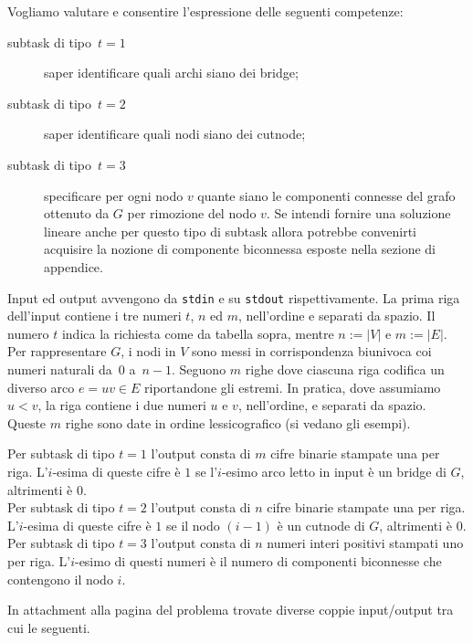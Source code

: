 Vogliamo valutare e consentire l'espressione delle seguenti competenze:
\begin{description}
\item[subtask di tipo~$t=1$] saper identificare quali archi siano dei bridge;
\item[subtask di tipo~$t=2$] saper identificare quali nodi siano dei cutnode;
\item[subtask di tipo~$t=3$] specificare per ogni nodo $v$ quante siano le componenti connesse del grafo ottenuto da $G$ per rimozione del nodo $v$. Se intendi fornire una soluzione lineare anche per questo tipo di subtask allora potrebbe convenirti acquisire la nozione di componente biconnessa esposte nella sezione di appendice. 
\end{description}



Input ed output avvengono da \verb'stdin' e su \verb'stdout' rispettivamente.
La prima riga dell'input contiene i tre numeri $t$, $n$ ed $m$, nell'ordine e separati da spazio. Il numero $t$ indica la richiesta come da tabella sopra, mentre $n:=|V|$ e $m:=|E|$. Per rappresentare $G$, i nodi in $V$ sono messi in corrispondenza biunivoca coi numeri naturali da~$0$ a~$n-1$.
Seguono $m$ righe dove ciascuna riga codifica un diverso arco $e=uv\in E$ riportandone gli estremi. In pratica, dove assumiamo $u < v$, la riga contiene i due numeri $u$ e $v$, nell'ordine, e separati da spazio.
Queste $m$ righe sono date in ordine lessicografico (si vedano gli esempi).

\indent
Per subtask di tipo $t=1$ l'output consta di $m$ cifre binarie stampate una per riga. L'$i$-esima di queste cifre è $1$ se l'$i$-esimo arco letto in input è un bridge di $G$, altrimenti è $0$.\\
\indent
Per subtask di tipo $t=2$ l'output consta di $n$ cifre binarie stampate una per riga. L'$i$-esima di queste cifre è $1$ se il nodo $(i-1)$ è un cutnode di $G$, altrimenti è $0$.\\
\indent
Per subtask di tipo $t=3$ l'output consta di $n$ numeri interi positivi stampati uno per riga. L'$i$-esimo di questi numeri è il numero di componenti biconnesse che contengono il nodo $i$. 



In attachment alla pagina del problema trovate diverse coppie input/output tra cui le seguenti.

